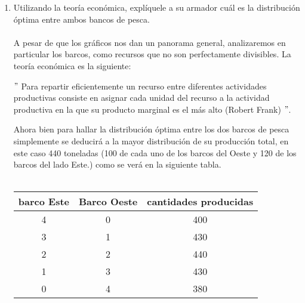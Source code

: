 \begin{enumerate}
\begin{multicols}{2}
\begin{center}
	    \end{center}
	\end{multicols}
	    \vspace{1cm}

	\begin{enumerate}[\bfseries a)]

	    \item Utilizando la teoría económica, explíquele a su armador cuál es la distribución óptima entre ambos bancos de pesca.\\\\
		A pesar de que los gráficos nos dan un panorama general, analizaremos en particular los barcos, como recursos que no son perfectamente divisibles. La teoría económica es la siguiente:
		\begin{center}
		    $"$ Para repartir eficientemente un recurso entre diferentes actividades productivas consiste en asignar cada unidad del recurso a la actividad productiva en la que su producto marginal es el más alto  (Robert Frank) $"$.
		\end{center}
		Ahora bien para hallar la distribución óptima entre los dos barcos de pesca simplemente se deducirá a la mayor distribución de su producción total, en este caso 440 toneladas (100 de cada uno de los barcos del Oeste y 120 de los barcos del lado Este.) como se verá en la siguiente tabla.\\\\
	    \begin{tcolorbox}[colframe=white]
		\begin{center}
		    \begin{tabular}{|cc||c|}
			\hline
			barco Este&Barco Oeste&cantidades producidas\\
			\hline
			4&0&400\\
			3&1&430\\
			\hline
			2&2&440\\
			\hline
			1&3&430\\
			0&4&380\\
			\hline
		    \end{tabular}
		\end{center}
	    \end{tcolorbox}
	    \vspace{1cm}


\end{enumerate}
\end{enumerate}
